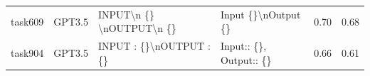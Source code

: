 \begin{longtable}{@{}p{0.8cm\tiny}p{1cm\tiny}p{4.1cm\ttfamily\tiny}p{4.1cm\ttfamily\tiny}p{0.8cm\tiny}p{0.8cm\tiny}@{}}
task609   & GPT3.5    & INPUT\textbackslash{}n \{\} \textbackslash{}nOUTPUT\textbackslash{}n \{\}                                                                                                                                                                                                                                                                                                                                                                                                                                               & Input \{\}\textbackslash{}nOutput \{\}                                                                                                                                                                                                                                                                                                                                                                                                                                                                                                                                            & 0.70 & 0.68 \\
task904   & GPT3.5    & INPUT : \{\}\textbackslash{}nOUTPUT : \{\}                                                                                                                                                                                                                                                                                                                                                                                                                                                                              & Input:: \{\}, Output:: \{\}                                                                                                                                                                                                                                                                                                                                                                                                                                                                                                                                                       & 0.66 & 0.61 \\

\end{longtable}
